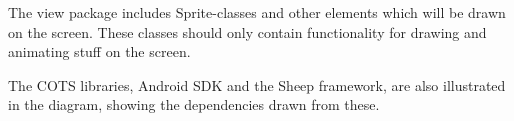 The view package includes Sprite-classes and other elements which will be drawn on the screen. These classes should only contain functionality for drawing and animating stuff on the screen.

The COTS libraries, Android SDK and the Sheep framework, are also illustrated in the diagram, showing the dependencies drawn from these.

